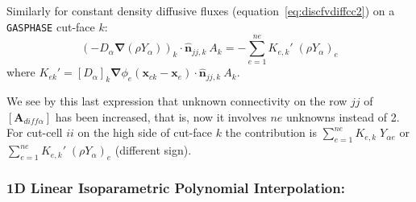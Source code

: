 \documentclass[12pt]{article}
\begin{document}
Similarly for constant density diffusive fluxes (equation~\eqref{eq:discfvdiffcc2}) on a \texttt{GASPHASE} cut-face $k$:
%
\begin{equation}
   \left( - D_\alpha \boldsymbol{\nabla} \left( \rho Y_\alpha \right) \right)_k \cdot \hat{\mathbf{n}}_{jj,k} \: A_k = - \sum^{ne}_{e=1} K_{e,k}' \; \left( \rho Y_{\alpha} \right)_e \label{eq:kekdiff2}
\end{equation}
%
where $K_{ek}' = [D_\alpha]_k \boldsymbol{\nabla} \phi_e(\mathbf{x}_{ck}-\mathbf{x}_e) \cdot \hat{\mathbf{n}}_{jj,k} \: A_k$.

We see by this last expression that unknown connectivity on the row $jj$ of $\left[ \mathbf{A}_{diff \alpha} \right]$ has been increased, that is, now it involves $ne$ unknowns instead of 2. For cut-cell $ii$ on the high side of cut-face $k$ the contribution is $\sum^{ne}_{e=1} K_{e,k} \; Y_{\alpha e}$ or  $\sum^{ne}_{e=1} K_{e,k}' \; \left( \rho Y_{\alpha} \right)_e$ (different sign).


\subsubsection*{1D Linear Isoparametric Polynomial Interpolation:}
\end{document}

